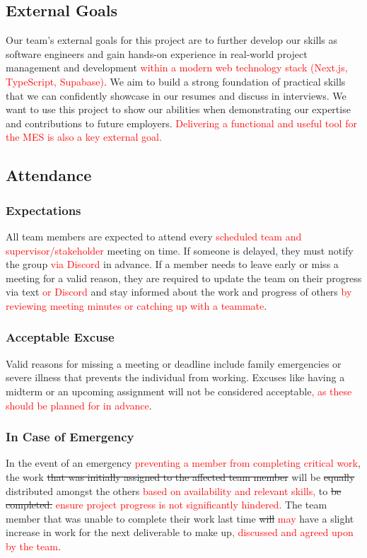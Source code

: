 \documentclass{article}
\begin{document}
\subsection*{External Goals}
Our team’s external goals for this project are to further develop our skills as software engineers and gain hands-on experience in real-world project management and development \textcolor{red}{within a modern web technology stack (Next.js, TypeScript, Supabase)}. We aim to build a strong foundation of practical skills that we can confidently showcase in our resumes and discuss in interviews. We want to use this project to show our abilities when demonstrating our expertise and contributions to future employers. \textcolor{red}{Delivering a functional and useful tool for the MES is also a key external goal.}

\subsection*{Attendance}

\subsubsection*{Expectations}
All team members are expected to attend every \textcolor{red}{scheduled team and supervisor/stakeholder} meeting on time. If someone is delayed, they must notify the group \textcolor{red}{via Discord} in advance. If a member needs to leave early or miss a meeting for a valid reason, they are required to update the team on their progress via text \textcolor{red}{or Discord} and stay informed about the work and progress of others \textcolor{red}{by reviewing meeting minutes or catching up with a teammate}.

\subsubsection*{Acceptable Excuse}
Valid reasons for missing a meeting or deadline include family emergencies or severe illness that prevents the individual from working. Excuses like having a midterm or an upcoming assignment will not be considered acceptable\textcolor{red}{, as these should be planned for in advance}.

\subsubsection*{In Case of Emergency}
In the event of an emergency \textcolor{red}{preventing a member from completing critical work}, the work \sout{that was initially assigned to the affected team member} will be \sout{equally} distributed amongst the others \textcolor{red}{based on availability and relevant skills,} to \sout{be completed.} \textcolor{red}{ensure project progress is not significantly hindered.} The team member that was unable to complete their work last time \sout{will} \textcolor{red}{may} have a slight increase in work for the next deliverable to make up\textcolor{red}{, discussed and agreed upon by the team}.
\end{document}
